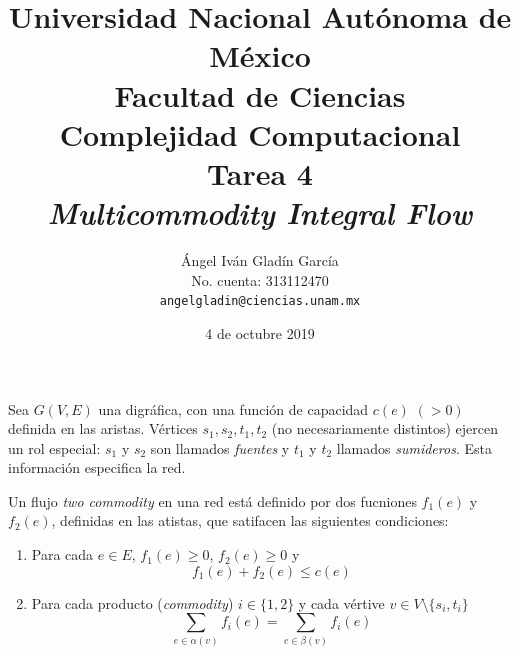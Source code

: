 \documentclass[12pt,letterpaper]{article}
\begin{document}
\title{
        Universidad Nacional Autónoma de México\\
        Facultad de Ciencias\\
        Complejidad Computacional\\
    \vspace{1cm}
    \large
        \textbf{Tarea 4}\\
        \textbf{\textit{Multicommodity Integral Flow}}
}
\author{
    Ángel Iván Gladín García\\
    No. cuenta: 313112470\\
    \texttt{angelgladin@ciencias.unam.mx}
}
\date{4 de octubre 2019}
\maketitle

\newtheorem{theorem}{Teorema}
\newtheorem{example}{Ejemplo}
\newtheorem{corollary}{Corolario}
\newtheorem{lemma}{Lemma}
\newtheorem{definition}{Definicion}
\newtheorem{prop}{Proposicion}

Sea $G(V,E)$ una digráfica, con una función de capacidad $c(e)$ $(>0)$ definida en las aristas.
Vértices $s_1,s_2,t_1,t_2$ (no necesariamente distintos) ejercen un rol especial: $s_1$ y
$s_2$ son llamados \emph{fuentes} y $t_1$ y $t_2$ llamados \emph{sumideros}. Esta información
especifica la red.

Un flujo \textit{two commodity} en una red está definido por dos fucniones $f_1(e)$ y $f_2(e)$,
definidas en las atistas, que satifacen las siguientes condiciones:

\begin{enumerate}
    \item Para cada $e \in E$, $f_1(e) \geq 0$, $f_2(e) \geq 0$ y
    $$  f_1(e) + f_2(e) \leq c(e)  $$
    \item Para cada producto (\textit{commodity}) $i \in \{ 1,2 \}$ y cada vértive
    $v \in V \setminus \{ s_i, t_i \}$
    $$  \sum_{e \in \alpha(v)} f_i(e) = \sum_{e \in \beta(v)} f_i(e)   $$
\end{enumerate}
\end{document}
